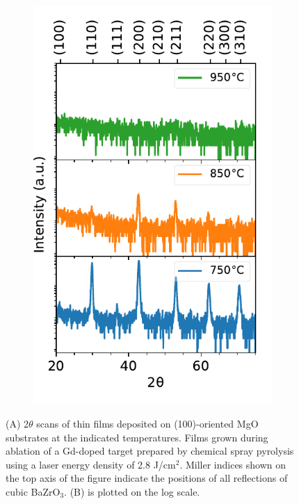 \begin{figure}
\begin{subfigure}[b]{0.45\linewidth}
        \includegraphics[width=\linewidth]{Figures/180316-thin-film-2theta-log.pdf}
        \caption{}
        \label{fig:film:xrd:2theta:log}
    \end{subfigure}
    \caption{(A) 2$\theta$ scans of thin films deposited on (100)-oriented MgO substrates at the indicated temperatures. Films grown during ablation of a Gd-doped target prepared by chemical spray pyrolysis using a laser energy density of 2.8 J/cm$^2$. Miller indices shown on the top axis of the figure indicate the positions of all reflections of cubic BaZrO$_3$. (B) is plotted on the log scale.}
\end{figure}

